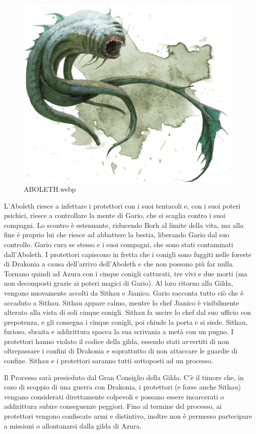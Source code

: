 \begin{figure}
\centering
\includegraphics{ABOLETH.webp}
\caption{ABOLETH.webp}
\end{figure}

L'Aboleth riesce a infettare i protettori con i suoi tentacoli e, con i
suoi poteri psichici, riesce a controllare la mente di Gario, che si
scaglia contro i suoi compagni. Lo scontro è estenuante, riducendo Borh
al limite della vita, ma alla fine è proprio lui che riesce ad abbattere
la bestia, liberando Gario dal suo controllo. Gario cura se stesso e i
suoi compagni, che sono stati contaminati dall'Aboleth. I protettori
capiscono in fretta che i conigli sono fuggiti nelle foreste di Drakonia
a causa dell'arrivo dell'Aboleth e che non possono più far nulla.
Tornano quindi ad Azura con i cinque conigli catturati, tre vivi e due
morti (ma non decomposti grazie ai poteri magici di Gario). Al loro
ritorno alla Gilda, vengono nuovamente accolti da Sithau e Jianico.
Gario racconta tutto ciò che è accaduto a Sithau. Sithau appare calmo,
mentre lo chef Jianico è visibilmente alterato alla vista di soli cinque
conigli. Sithau fa uscire lo chef dal suo ufficio con prepotenza, e gli
consegna i cinque conigli, poi chiude la porta e si siede. Sithau,
furioso, sbraita e addirittura spacca la sua scrivania a metà con un
pugno. I protettori hanno violato il codice della gilda, essendo stati
avvertiti di non oltrepassare i confini di Drakonia e soprattutto di non
attaccare le guardie di confine. Sithau e i protettori saranno tutti
sottoposti ad un processo.

Il Processo sarà presieduto dal Gran Consiglio della Gilda. C'è il
timore che, in caso di scoppio di una guerra con Drakonia, i protettori
(e forse anche Sithau) vengano considerati direttamente colpevoli e
possano essere incarcerati o addirittura subire conseguenze peggiori.
Fino al termine del processo, ai protettori vengono confiscate armi e
distintivo, inoltre non è permesso partecipare a missioni o allontanarsi
dalla gilda di Azura.
